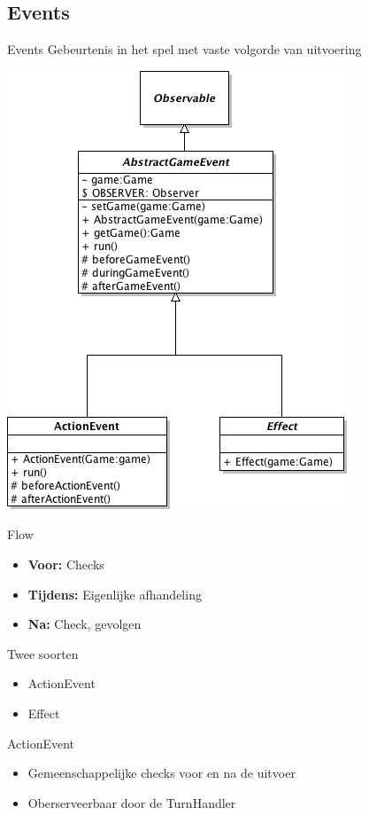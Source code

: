 \documentclass[t]{beamer}
\begin{document}
\subsection{Events}
\begin{frame}{Events}
Gebeurtenis in het spel met vaste volgorde van uitvoering

\begin{multicols}{2}
\begin{center}
\includegraphics[width=0.60\linewidth]{images/GameEvent}
\end{center}
Flow
\begin{itemize}
	\item \textbf{Voor:} Checks
	\item \textbf{Tijdens:} Eigenlijke afhandeling
	\item \textbf{Na:} Check, gevolgen
\end{itemize}
Twee soorten
\begin{itemize}
	\item ActionEvent
	\item Effect
\end{itemize}
\end{multicols}

\end{frame}

\begin{frame}{ActionEvent}
\begin{itemize}
	\item Gemeenschappelijke checks voor en na de uitvoer
	\item Oberserveerbaar door de TurnHandler
\end{itemize}
\end{frame}
\end{document}
